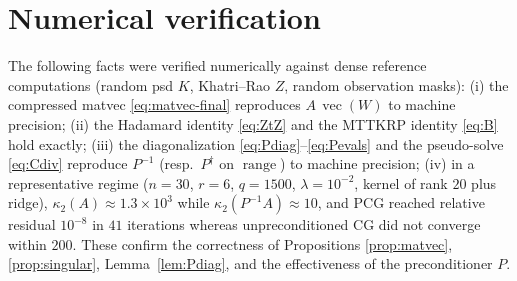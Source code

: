 \documentclass[12pt]{article}
\DeclareMathOperator{\vecop}{vec}
\DeclareMathOperator{\range}{range}
\begin{document}
\section{Numerical verification}

The following facts were verified numerically against dense reference
computations (random psd $K$, Khatri--Rao $Z$, random observation masks):
(i) the compressed matvec \eqref{eq:matvec-final} reproduces
$A\,\vecop(W)$ to machine precision; (ii) the Hadamard identity
\eqref{eq:ZtZ} and the MTTKRP identity \eqref{eq:B} hold exactly;
(iii) the diagonalization \eqref{eq:Pdiag}--\eqref{eq:Pevals} and the
pseudo-solve \eqref{eq:Cdiv} reproduce $P^{-1}$ (resp.\ $P^{\dagger}$ on
$\range$) to machine precision; (iv) in a representative regime
($n=30$, $r=6$, $q=1500$, $\lambda=10^{-2}$, kernel of rank $20$ plus
ridge), $\kappa_2(A)\approx 1.3\times10^{3}$ while
$\kappa_2(P^{-1}A)\approx 10$, and PCG reached relative residual
$10^{-8}$ in $41$ iterations whereas unpreconditioned CG did not converge
within $200$. These confirm the correctness of Propositions
\ref{prop:matvec}, \ref{prop:singular}, Lemma~\ref{lem:Pdiag}, and the
effectiveness of the preconditioner $P$.
\end{document}
